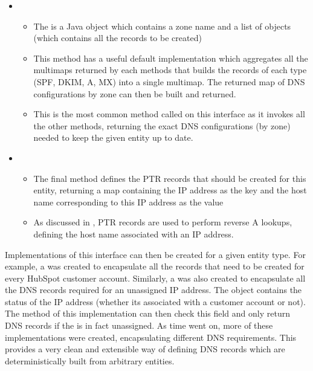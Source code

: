 \begin{itemize}
      \item{}
      \begin{itemize}
            \item{The  is a Java object which contains a zone name and a list of  objects (which contains all the records to be created)}
            \item{This method has a useful default implementation which aggregates all the multimaps returned by each methods that builds the records of each type (SPF, DKIM, A, MX) into a single multimap. The returned map of DNS configurations by zone can then be built and returned.}
            \item{This is the most common method called on this interface as it invokes all the other methods, returning the exact DNS configurations (by zone) needed to keep the given entity up to date.}
      \end{itemize}

      \item{}
      \begin{itemize}
            \item{The final method defines the PTR records that should be created for this entity, returning a map containing the IP address as the key and the host name corresponding to this IP address as the value}
            \item{As discussed in , PTR records are used to perform reverse A lookups, defining the host name associated with an IP address.}
      \end{itemize}
\end{itemize}

Implementations of this interface can then be created for a given entity type. For example, a  was created to encapsulate all the records that need to be created for every HubSpot customer account. Similarly, a  was also created to encapsulate all the DNS records required for an unassigned IP address. The  object contains the status of the IP address (whether its associated with a customer account or not). The  method of this implementation can then check this field and only return DNS records if the  is in fact unassigned. As time went on, more of these  implementations were created, encapsulating different DNS requirements. This provides a very clean and extensible way of defining DNS records which are deterministically built from arbitrary entities.

